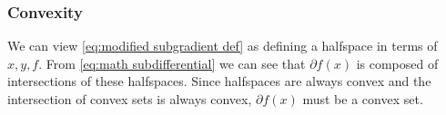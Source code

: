 \documentclass[journal,onecolumn]{IEEEtran}
\begin{document}
\subsubsection{Convexity}
We can view \eqref{eq:modified subgradient def} as defining a halfspace in terms of \(x, y, f\). From \eqref{eq:math subdifferential} we can see that \(\partial f(x)\) is composed of intersections of these halfspaces. Since halfspaces are always convex and the intersection of convex sets is always convex, \(\partial f(x)\) must be a convex set.



\end{document}
